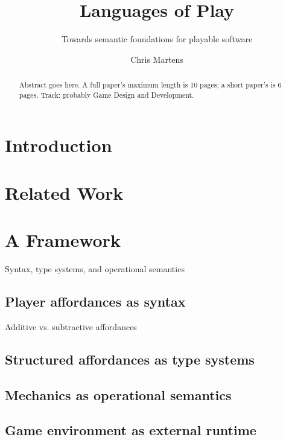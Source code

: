\documentclass[sigconf]{acmart}
\begin{document}
\title{Languages of Play}
\subtitle{Towards semantic foundations for playable software}


\author{Chris Martens}


\begin{abstract}
Abstract goes here. A full paper's maximum length is 10 pages; a short
paper's is 6 pages. Track: probably Game Design and Development.
\end{abstract}



\maketitle

\section{Introduction}

\section{Related Work}

\section{A Framework}

  Syntax, type systems, and operational semantics

  \subsection{Player affordances as syntax}

  Additive vs. subtractive affordances

  \subsection{Structured affordances as type systems}

  \subsection{Mechanics as operational semantics}

  \subsection{Game environment as external runtime}
\end{document}
